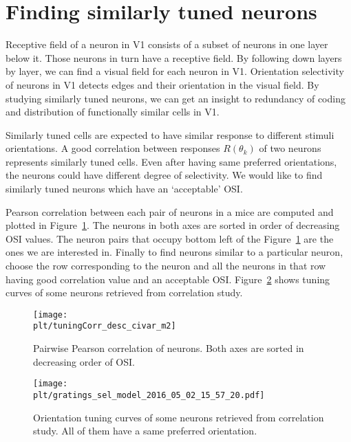 \documentclass[MTech]{iitmdiss}
\newcommand{\plt}{thesis_plots}
\begin{document}
\section{Finding similarly tuned neurons} %
\label{sec:finding_similarly_tuned_neurons}
Receptive field of a neuron in V1 consists of a subset of neurons in one layer below it. Those neurons in turn have a receptive field. By following down layers by layer, we can find a visual field for each neuron in V1. Orientation selectivity of neurons in V1 detects edges and their orientation in the visual field. By studying similarly tuned neurons, we can get an insight to redundancy of coding and distribution of functionally similar cells in V1.

Similarly tuned cells are expected to have similar response to different stimuli orientations. A good correlation between responses $R(\theta_k)$ of two neurons represents similarly tuned cells. Even after having same preferred orientations, the neurons could have different degree of selectivity. We would like to find similarly tuned neurons which have an `acceptable' OSI.

Pearson correlation between each pair of neurons in a mice are computed and plotted in Figure~\ref{fig:corr}. The neurons in both axes are sorted in order of decreasing OSI values. The neuron pairs that occupy bottom left of the Figure~\ref{fig:corr} are the ones we are interested in. Finally to find neurons similar to a particular neuron, choose the row corresponding to the neuron and all the neurons in that row having good correlation value and an acceptable OSI. Figure~\ref{fig:tunecurves} shows tuning curves of some neurons retrieved from correlation study.
\begin{figure}[h]
  \centering
  \texttt{[image: \\plt/tuningCorr\_desc\_civar\_m2]}
  \caption{Pairwise Pearson correlation of neurons. Both axes are sorted in decreasing order of OSI.}
  \label{fig:corr}
\end{figure}
\begin{figure}[h]
  \centering
  \texttt{[image: \\plt/gratings\_sel\_model\_2016\_05\_02\_15\_57\_20.pdf]}
  \caption{Orientation tuning curves of some neurons retrieved from correlation study. All of them have a same preferred orientation.}
  \label{fig:tunecurves}
\end{figure}
\end{document}
